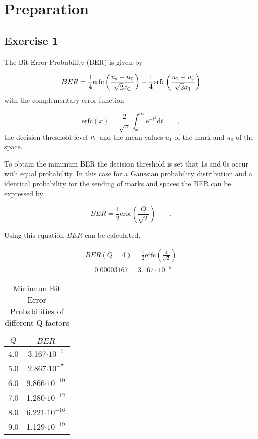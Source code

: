 \chapter{Preparation}


\section{Exercise 1}
The Bit Error Probability (BER) is given by

\begin{equation}
BER = \frac{1}{4}\mathrm{erfc}\left(\frac{u_{\mathrm{s}}-u_0}{\sqrt{2}\sigma_0}\right)+\frac{1}{4}\mathrm{erfc}\left(\frac{u_{\mathrm{1}}-u_{\mathrm{s}}}{\sqrt{2}\sigma_1}\right)
\label{eq:}
\end{equation}
with the complementary error function

\begin{equation}
\mathrm{erfc}(x)=\frac{2}{\sqrt{\pi}}\int^{\infty}_x\mathrm{e}^{-t^2}\mathrm{d}t\qquad,
\label{eq:}
\end{equation}
the decision threshold level $u_{\mathrm{s}}$ and the mean values $u_1$ of the mark and $u_0$ of the space.

To obtain the minimum BER the decision threshold is set that 1s and 0s occur with equal probability. In this case for a Gaussian probability distribution and a identical probability for the sending of marks and spaces the BER can be expressed by

\begin{equation}
BER = \frac{1}{2}\mathrm{erfc}\left(\frac{Q}{\sqrt{2}}\right)\qquad.
\label{eq:p1_BER}
\end{equation}

Using this equation $BER$ can be calculated.

\begin{equation}
\begin{split}
BER(Q=4) = \frac{1}{2}\mathrm{erfc}\left(\frac{4}{\sqrt{2}}\right)\\
=0.00003167=3.167\cdot 10^{-5}
\end{split}
\label{eq:}
\end{equation}

\begin{table}[h]%
\centering
\caption{Minimum Bit Error Probabilities of different Q-factors}
 
\begin{tabular}{cc}

\toprule

$Q$	& $BER$\\
\midrule
4.0 & 3.167$\cdot 10^{-5}$\\
5.0& 2.867$\cdot 10^{-7}$  \\
6.0& 9.866$\cdot 10^{-10}$ \\
7.0& 1.280$\cdot 10^{-12}$ \\
8.0&6.221$\cdot 10^{-16}$ \\
9.0&1.129$\cdot 10^{-19}$ \\
\bottomrule 
\end{tabular}
\label{tab:1_daempfung}
\end{table}

